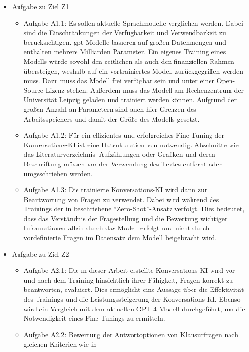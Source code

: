 \begin{itemize}
  \item Aufgabe zu Ziel Z1
  \begin{itemize}
    \item Aufgabe A1.1: Es sollen aktuelle Sprachmodelle verglichen werden. Dabei sind die Einschränkungen der Verfügbarkeit und Verwendbarkeit zu berücksichtigen.
    \ac{gpt}-Modelle basieren auf großen Datenmengen und enthalten mehrere Milliarden Parameter.
    Ein eigenes Training eines Modells würde sowohl den zeitlichen als auch den finanziellen Rahmen übersteigen, weshalb auf ein vortrainiertes Modell zurückgegriffen werden muss.
    Dazu muss das Modell frei verfügbar sein und unter einer Open-Source-Lizenz stehen. Außerdem muss das Modell am Rechenzentrum der Universität Leipzig geladen und trainiert werden können. Aufgrund der großen Anzahl an Parametern sind auch hier Grenzen des Arbeitsspeichers und damit der Größe des Modells gesetzt.
    \item Aufgabe A1.2: Für ein effizientes und erfolgreiches Fine-Tuning der Konversations-KI ist eine Datenkuration von \citet{bb} notwendig.
    Abschnitte wie das Literaturverzeichnis, Aufzählungen oder Grafiken und deren Beschriftung müssen vor der Verwendung des Textes entfernt oder umgeschrieben werden.
    \item Aufgabe A1.3: Die trainierte Konversations-KI wird dann zur Beantwortung von Fragen zu \citet{bb} verwendet.
    Dabei wird während des Trainings der in \citet{gpt3} beschriebene \enquote{Zero-Shot}-Ansatz verfolgt.
    Dies bedeutet, dass das Verständnis der Fragestellung und die Bewertung wichtiger Informationen allein durch das Modell erfolgt und nicht durch vordefinierte Fragen im Datensatz dem Modell beigebracht wird.
  \end{itemize}
  \item Aufgabe zu Ziel Z2
  \begin{itemize}
    \item Aufgabe A2.1: Die in dieser Arbeit erstellte Konversations-KI wird vor und nach dem Training hinsichtlich ihrer Fähigkeit, Fragen korrekt zu beantworten, evaluiert.
    Dies ermöglicht eine Aussage über die Effektivität des Trainings und die Leistungssteigerung der Konversations-KI.\@
    Ebenso wird ein Vergleich mit dem aktuellen GPT-4 Modell \citep{gpt4} durchgeführt, um die Notwendigkeit eines Fine-Tunings zu ermitteln.
    \item Aufgabe A2.2: Bewertung der Antwortoptionen von Klausurfragen nach gleichen Kriterien wie in \citet{chatgpt_qas}
  \end{itemize}
\end{itemize}

